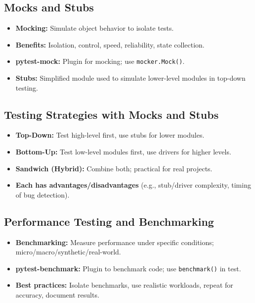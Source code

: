 \documentclass[11pt,a4paper]{article}
\begin{document}
\subsection*{Mocks and Stubs}
\begin{itemize}
    \item \textbf{Mocking:} Simulate object behavior to isolate tests.
    \item \textbf{Benefits:} Isolation, control, speed, reliability, state collection.
    \item \textbf{pytest-mock:} Plugin for mocking; use \texttt{mocker.Mock()}.
    \item \textbf{Stubs:} Simplified module used to simulate lower-level modules in top-down testing.
\end{itemize}

\subsection*{Testing Strategies with Mocks and Stubs}
\begin{itemize}
    \item \textbf{Top-Down:} Test high-level first, use stubs for lower modules.
    \item \textbf{Bottom-Up:} Test low-level modules first, use drivers for higher levels.
    \item \textbf{Sandwich (Hybrid):} Combine both; practical for real projects.
    \item \textbf{Each has advantages/disadvantages} (e.g., stub/driver complexity, timing of bug detection).
\end{itemize}

\subsection*{Performance Testing and Benchmarking}
\begin{itemize}
    \item \textbf{Benchmarking:} Measure performance under specific conditions; micro/macro/synthetic/real-world.
    \item \textbf{pytest-benchmark:} Plugin to benchmark code; use \texttt{benchmark()} in test.
    \item \textbf{Best practices:} Isolate benchmarks, use realistic workloads, repeat for accuracy, document results.
\end{itemize}
\end{document}
